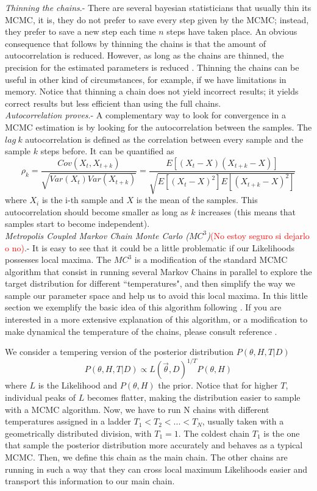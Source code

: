 \documentclass[onecolumn,           %
               showpacs,            %
               preprintnumbers,     %
               aps,                 %
               prl,          	    %
               letterpaper,             %
               superscriptaddress,      %
               nofootinbib,         %
               tightenlines,        %
               floats,floatfix      %
               ,usenatbib,
               ]{revtex4-1}
\begin{document}
 \textit{Thinning the chains}.- There are several bayesian statisticians that usually thin its MCMC, it is, they do not prefer to save every step given by the MCMC; instead, they prefer to save a new step each time $n$ steps have taken place. An obvious consequence that follows by thinning the chains is that the amount of autocorrelation is reduced. However, as long as the chains are thinned, the precision for the estimated parameters is reduced \cite{thin}. Thinning the chains can be useful in other kind of circumstances, for example, if we have limitations in memory. Notice that thinning a chain does not yield incorrect results; it yields correct results but less efficient than using the full chains.       
\\

\textit{Autocorrelation proves}.- A complementary way to look for convergence in a MCMC estimation is by looking for the autocorrelation between the samples. The $lag\ k$ autocorrelation is defined as the correlation between every sample and the sample $k$ steps before. It can be quantified as \cite{autocor}
\begin{equation}
\rho_k=\frac{Cov(X_t,X_{t+k})}{\sqrt{Var(X_t)Var(X_{t+k})}}=\frac{E[(X_t-X)(X_{t+k}-X)]}{\sqrt{E[(X_t-X)^2]E[(X_{t+k}-X)^2]}}
\end{equation}
where $X_i$ is the i-th sample and $X$ is the mean of the samples. This autocorrelation should become smaller as long as $k$ increases (this means that samples start to become independent).\\

\textit{Metropolis Coupled Markov Chain Monte Carlo ($MC^3$)}\textcolor{red}{(No estoy seguro si dejarlo o no)}.- It is easy to see that it could be a little problematic if our Likelihoods possesses local maxima. The $MC^3$ is a modification of the standard MCMC algorithm that consist in running several Markov Chains in parallel to explore the target distribution for different  ``temperatures", and then simplify the way we sample our parameter space and help us to avoid this local maxima. In this little section we exemplify the basic idea of this algorithm following \cite{mcmcmc}. If you are interested in a more extensive explanation of this algorithm, or a modification to make dynamical the temperature of the chains, please consult reference \cite{mcmcmc}.

We consider a tempering version of the posterior distribution $P(\theta,H,T|D)$
\begin{equation}
P(\theta,H,T|D) \propto L(\vec\theta,D)^{1/T}P(\theta,H)
\end{equation}
where $L$ is the Likelihood and $P(\theta,H)$ the prior. Notice that for higher $T$, individual peaks of $L$ becomes flatter, making the distribution easier to sample with a MCMC algorithm. Now, we have to run N chains with different temperatures assigned in a ladder $T_1<T_2<...<T_N$, usually taken with a geometrically distributed division, with $T_1=1$. The coldest chain $T_1$ is the one that sample the posterior distribution more accurately and behaves as a typical MCMC. Then, we define this chain as the main chain. The other chains are running in such a way that they can cross local maximum Likelihoods easier and transport this information to our main chain.  
\end{document}
